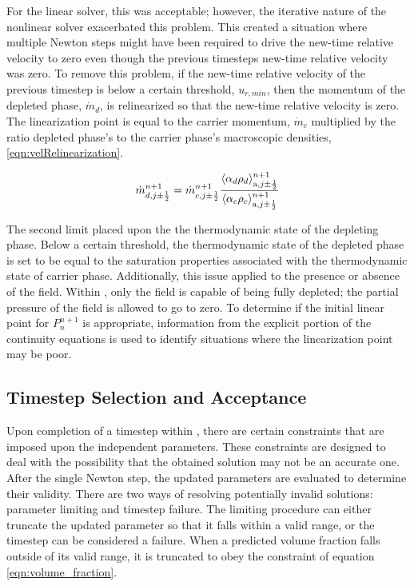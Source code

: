 For the linear solver, this was acceptable; however, the iterative nature of the nonlinear solver exacerbated this problem.
This created a situation where multiple Newton steps might have been required to drive the new-time relative velocity to zero even though the previous timesteps new-time relative velocity was zero.
To remove this problem, if the new-time relative velocity of the previous timestep is below a certain threshold, $u_{r, min}$, then the momentum of the depleted phase, $\dot{m}_{d}$, is relinearized so that the new-time relative velocity is zero.
The linearization point is equal to the carrier momentum, $\dot{m}_{c}$ multiplied by the ratio depleted phase's to the carrier phase's macroscopic densities, \eqref{eqn:velRelinearization}.

\begin{equation}
\label{eqn:velRelinearization}
\dot{m}^{n+1}_{d, j \pm \onehalf} = \dot{m}^{n+1}_{c, j \pm \onehalf} \frac{\ave{\alpha_{d} \rho_{d}}^{n+1}_{\text{a}, j \pm \onehalf}}{\ave{\alpha_{c} \rho_{c}}^{n+1}_{\text{a}, j \pm \onehalf}}
\end{equation}

The second limit placed upon the the thermodynamic state of the depleting phase.
Below a certain threshold, the thermodynamic state of the depleted phase is set to be equal to the saturation properties associated with the thermodynamic state of carrier phase.
Additionally, this issue applied to the presence or absence of the \ncg{} field.
Within \cobra{}, only the \ncg{} field is capable of being fully depleted; the partial pressure of the \ncg{} field is allowed to go to zero.
To determine if the initial linear point for $P^{n+1}_{n}$ is appropriate, information from the explicit portion of the continuity equations is used to identify situations where the linearization point may be poor.

\subsection{Timestep Selection and Acceptance}
\label{subsect:nlnTimesteps}

Upon completion of a timestep within \cobra{}, there are certain constraints that are imposed upon the independent parameters.
These constraints are designed to deal with the possibility that the obtained solution may not be an accurate one.
After the single Newton step, the updated parameters are evaluated to determine their validity.
There are two ways of resolving potentially invalid solutions: parameter limiting and timestep failure.
The limiting procedure can either truncate the updated parameter so that it falls within a valid range, or the timestep can be considered a failure.
When a predicted volume fraction falls outside of its valid range, it is truncated to obey the constraint of equation \eqref{eqn:volume_fraction}.

